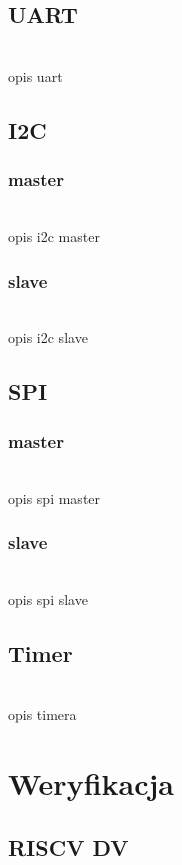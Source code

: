 \documentclass[11pt,a4paper]{article}
\begin{document}
	\subsection{UART}
	\hspace{5mm}
		\\opis uart

	\subsection{I2C}
		\subsubsection{master}
		\hspace{5mm}
			\\opis i2c master
		\subsubsection{slave}
		\hspace{5mm}
			\\opis i2c slave

	\subsection{SPI}
		\subsubsection{master}
		\hspace{5mm}
			\\opis spi master
		\subsubsection{slave}
		\hspace{5mm}
			\\opis spi slave

	\subsection{Timer}
	\hspace{5mm}
		\\opis timera


\newpage
\section{Weryfikacja}

	\subsection{RISCV DV}
\end{document}

